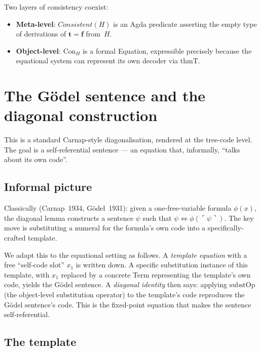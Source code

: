 \documentclass[11pt]{article}
\newcommand{\trueT}{\mathbf{t}}
\newcommand{\falseT}{\mathbf{f}}
\newcommand{\code}[1]{\ulcorner #1 \urcorner}
\newcommand{\thmT}{\mathrm{thmT}}
\newcommand{\substOp}{\mathrm{substOp}}
\begin{document}
Two layers of consistency coexist:
\begin{itemize}
\item \textbf{Meta-level}: $\mathit{Consistent}(H)$ is an Agda predicate
  asserting the empty type of derivations of $\trueT = \falseT$ from~$H$.
\item \textbf{Object-level}: $\mathrm{Con}_H$ is a formal Equation,
  expressible precisely because the equational system can represent
  its own decoder via $\thmT$.
\end{itemize}

\section{The G\"odel sentence and the diagonal construction}
\label{sec:diagonal}

This is a standard Carnap-style diagonalisation, rendered at the
tree-code level.  The goal is a self-referential sentence ---
an equation that, informally, ``talks about its own code''.

\subsection{Informal picture}

Classically (Carnap~1934, G\"odel~1931): given a one-free-variable
formula $\phi(x)$, the diagonal lemma constructs a sentence $\psi$
such that $\psi \iff \phi(\code{\psi})$.  The key move is
substituting a numeral for the formula's own code into a
specifically-crafted template.

We adapt this to the equational setting as follows.  A
\emph{template equation} with a free ``self-code slot'' $x_1$ is
written down.  A specific substitution instance of this template,
with $x_1$ replaced by a concrete Term representing the template's
own code, yields the G\"odel sentence.  A \emph{diagonal identity}
then says: applying $\substOp$ (the object-level substitution
operator) to the template's code reproduces the G\"odel sentence's
code.  This is the fixed-point equation that makes the sentence
self-referential.

\subsection{The template}
\end{document}
